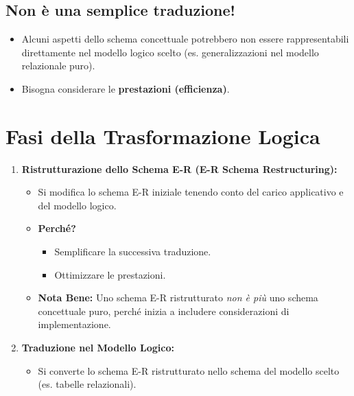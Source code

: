 	\subsection{Non è una semplice traduzione!}
	\begin{itemize}
		\item Alcuni aspetti dello schema concettuale potrebbero non essere rappresentabili direttamente nel modello logico scelto (es. generalizzazioni nel modello relazionale puro).
		\item Bisogna considerare le \textbf{prestazioni (efficienza)}.
	\end{itemize}
	
	\section{Fasi della Trasformazione Logica}
	\begin{enumerate}
		\item \textbf{Ristrutturazione dello Schema E-R (E-R Schema Restructuring):}
		\begin{itemize}
			\item Si modifica lo schema E-R iniziale tenendo conto del carico applicativo e del modello logico.
			\item \textbf{Perché?}
			\begin{itemize}
				\item Semplificare la successiva traduzione.
				\item Ottimizzare le prestazioni.
			\end{itemize}
			\item \textbf{Nota Bene:} Uno schema E-R ristrutturato \textit{non è più} uno schema concettuale puro, perché inizia a includere considerazioni di implementazione.
		\end{itemize}
		\item \textbf{Traduzione nel Modello Logico:}
		\begin{itemize}
			\item Si converte lo schema E-R ristrutturato nello schema del modello scelto (es. tabelle relazionali).
		\end{itemize}
	\end{enumerate}
	
